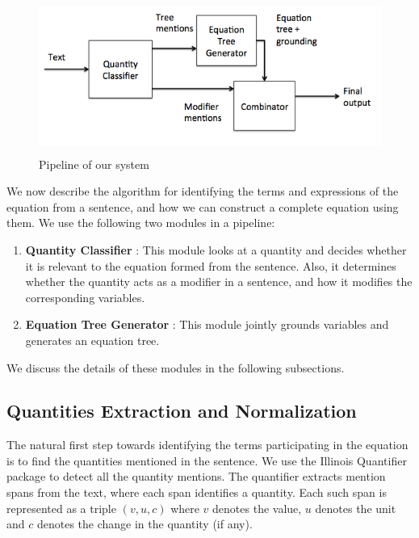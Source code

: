   \begin{figure}
        \centering
        \includegraphics[height=5cm]{pipeline.png}
        \caption{Pipeline of our system}
        \label{pipeline}
  \end{figure}


  We now describe the algorithm for identifying the terms and
  expressions of the equation from a sentence, and how we can
  construct a complete equation using them. We use the following two
  modules in a pipeline:
  \begin{enumerate}
    \item \textbf{Quantity Classifier} : This module looks at a quantity
      and decides whether it is relevant to the equation formed from
      the sentence. Also, it determines whether the
      quantity acts as a modifier in a sentence, and how it 
      modifies the corresponding variables.
      
    \item \textbf{Equation Tree Generator} : This module jointly
      grounds variables and generates an equation tree.
  \end{enumerate}

  We discuss the details of these modules in the following subsections.
  
  \subsection{Quantities Extraction and Normalization}
    The natural first step towards identifying the terms participating
    in the equation is to find the quantities mentioned in the
    sentence. We use the Illinois Quantifier package \cite{RoyViRo15}
    to detect all the quantity mentions.  The quantifier extracts
    mention spans from the text, where each span identifies a
    quantity. Each such span is represented as a triple $(v,u,c)$
    where $v$ denotes the value, $u$ denotes the unit and $c$ denotes
    the change in the quantity (if any).

